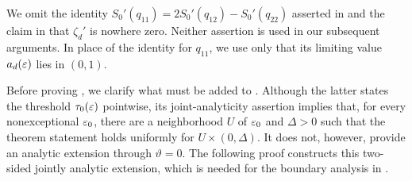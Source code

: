 \begin{remark}\label{rmk:krrs-omitted-identity}
We omit the identity \(S_0'(q_{11})=2S_0'(q_{12})-S_0'(q_{22})\)
asserted in \cite[Theorem~1.1]{kenyon2014entropy} and the claim in
\cite[Theorem~3.3]{kenyon2014entropy} that $\zeta_d'$ is nowhere zero.
Neither assertion is used in our subsequent arguments.
In place of the identity for $q_{11}$, we use only that its limiting value
$a_d(\varepsilon)$ lies in $(0,1)$.
\end{remark}

Before proving , we clarify what must be added to
.  Although the latter states the threshold
\(\tau_0(\varepsilon)\) pointwise, its joint-analyticity assertion implies that, for
every nonexceptional \(\varepsilon_0\), there are a neighborhood \(U\) of \(\varepsilon_0\)
and \(\Delta>0\) such that the theorem statement holds uniformly for
\(U\times(0,\Delta)\).  It does not, however, provide an analytic extension
through \(\vartheta=0\).  The following proof constructs this
two-sided jointly analytic extension, which is needed for the boundary
analysis in
.


